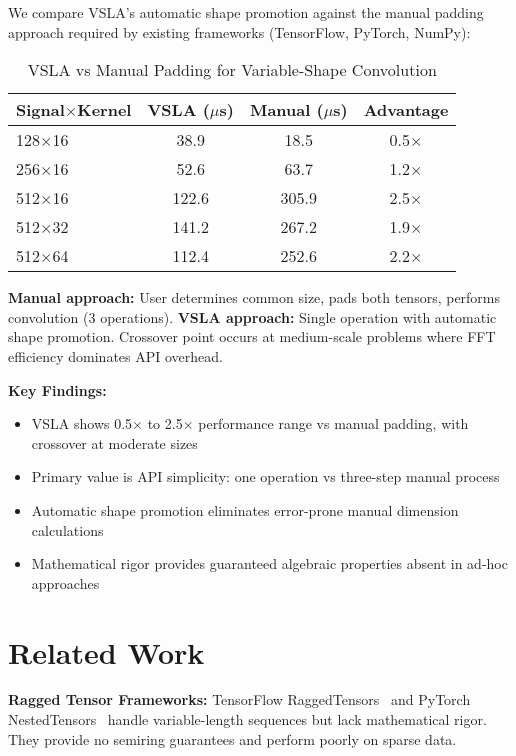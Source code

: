 \documentclass[sigconf,review]{acmart}
\begin{document}
We compare VSLA's automatic shape promotion against the manual padding approach required by existing frameworks (TensorFlow, PyTorch, NumPy):

\begin{table}[h]
\centering
\caption{VSLA vs Manual Padding for Variable-Shape Convolution}
\label{tab:performance}
\begin{tabular}{@{}lccc@{}}
\toprule
\textbf{Signal$\times$Kernel} & \textbf{VSLA ($\mu$s)} & \textbf{Manual ($\mu$s)} & \textbf{Advantage} \\
\midrule
128$\times$16 & 38.9 & 18.5 & 0.5$\times$ \\
256$\times$16 & 52.6 & 63.7 & 1.2$\times$ \\
512$\times$16 & 122.6 & 305.9 & 2.5$\times$ \\
512$\times$32 & 141.2 & 267.2 & 1.9$\times$ \\
512$\times$64 & 112.4 & 252.6 & 2.2$\times$ \\
\bottomrule
\end{tabular}
\begin{footnotesize}
\textbf{Manual approach:} User determines common size, pads both tensors, performs convolution (3 operations). \textbf{VSLA approach:} Single operation with automatic shape promotion. Crossover point occurs at medium-scale problems where FFT efficiency dominates API overhead.
\end{footnotesize}
\end{table}

\textbf{Key Findings:}
\begin{itemize}
\item VSLA shows 0.5$\times$ to 2.5$\times$ performance range vs manual padding, with crossover at moderate sizes
\item Primary value is API simplicity: one operation vs three-step manual process
\item Automatic shape promotion eliminates error-prone manual dimension calculations
\item Mathematical rigor provides guaranteed algebraic properties absent in ad-hoc approaches
\end{itemize}

\section{Related Work}
\label{sec:related}

\textbf{Ragged Tensor Frameworks:} TensorFlow RaggedTensors~\cite{TF2019} and PyTorch NestedTensors~\cite{PyTorch2021} handle variable-length sequences but lack mathematical rigor. They provide no semiring guarantees and perform poorly on sparse data.
\end{document}
